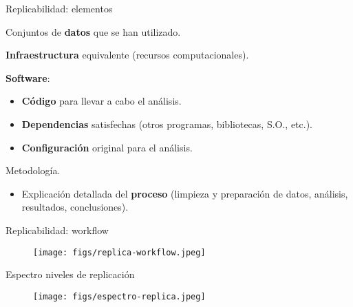 \begin{frame}{Replicabilidad: elementos}
 \begin{wideitemize}
  \item Conjuntos de \textbf{datos} que se han utilizado.
  \item \textbf{Infraestructura} equivalente (recursos computacionales).
  \item \textbf{Software}:
  \begin{itemize}
   \item \textbf{Código} para llevar a cabo el análisis.
   \item \textbf{Dependencias} satisfechas (otros programas, bibliotecas, S.O., etc.).
   \item \textbf{Configuración} original para el análisis.
  \end{itemize}
  
  \item Metodología.
  \begin{itemize}
   \item Explicación detallada del \textbf{proceso} (limpieza y preparación de
   datos, análisis, resultados, conclusiones).
  \end{itemize}

 \end{wideitemize}

\end{frame}


\begin{frame}{Replicabilidad: workflow}

\begin{figure}
 \centering
 \texttt{[image: figs/replica-workflow.jpeg]}
\end{figure}

\end{frame}


\begin{frame}{Espectro niveles de replicación}

\begin{figure}
 \centering
 \texttt{[image: figs/espectro-replica.jpeg]}
\end{figure}

\end{frame}


